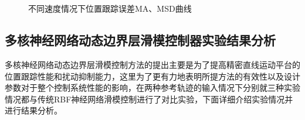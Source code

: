 \begin{figure}[H]
	 \\
	 \\
	\caption{不同速度情况下位置跟踪误差MA、MSD曲线}
	\label{不同速度情况下位置跟踪误差MA、MSD曲线2}
\end{figure}





\subsection{多核神经网络动态边界层滑模控制器实验结果分析}
多核神经网络动态边界层滑模控制方法的提出主要是为了提高精密直线运动平台的位置跟踪性能和扰动抑制能力，这里为了更有力地表明所提方法的有效性以及设计参数对于整个控制系统性能的影响，在两种参考轨迹的输入情况下分别就三种实验情况都与传统RBF神经网络滑模控制进行了对比实验，下面详细介绍实验情况并进行结果分析。

